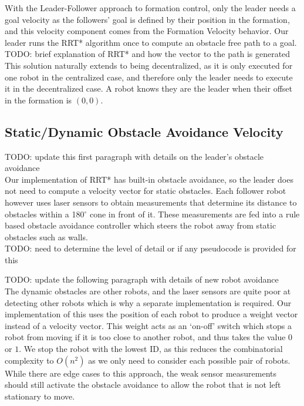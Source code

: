 \documentclass[letterpaper, 10 pt, conference]{ieeeconf}  %
\begin{document}
With the Leader-Follower approach to formation control, only the leader needs a goal velocity as the followers' goal is defined by their position in the formation, and this velocity component comes from the Formation Velocity behavior. Our leader runs the RRT* algorithm once to compute an obstacle free path to a goal. \\

TODO: brief explanation of RRT* and how the vector to the path is generated \\

This solution naturally extends to being decentralized, as it is only executed for one robot in the centralized case, and therefore only the leader needs to execute it in the decentralized case. A robot knows they are the leader when their offset in the formation is $(0,0)$.

\subsection{Static/Dynamic Obstacle Avoidance Velocity}

TODO: update this first paragraph with details on the leader's obstacle avoidance \\

Our implementation of RRT* has built-in obstacle avoidance, so the leader does not need to compute a velocity vector for static obstacles. Each follower robot however uses laser sensors to obtain measurements that determine its distance to obstacles within a 180$^{\circ}$ cone in front of it. These measurements are fed into a rule based obstacle avoidance controller which steers the robot away from static obstacles such as walls. \\

TODO: need to determine the level of detail or if any pseudocode is provided for this

TODO: update the following paragraph with details of new robot avoidance \\

The dynamic obstacles are other robots, and the laser sensors are quite poor at detecting other robots which is why a separate implementation is required. Our implementation of this uses the position of each robot to produce a weight vector instead of a velocity vector. This weight acts as an `on-off' switch which stops a robot from moving if it is too close to another robot, and thus takes the value $0$ or $1$. We stop the robot with the lowest ID, as this reduces the combinatorial complexity to $O(n^{2})$ as we only need to consider each possible pair of robots. While there are edge cases to this approach, the weak sensor measurements should still activate the obstacle avoidance to allow the robot that is not left stationary to move. \\
\end{document}
